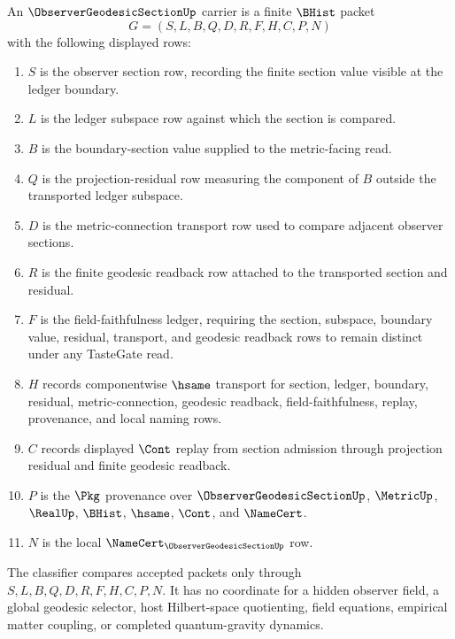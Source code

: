 \begin{definition}
\label{def:observer-geodesic-section-carrier}
An $\ObserverGeodesicSectionUp$ carrier is a finite $\BHist$ packet
$$
G=(S,L,B,Q,D,R,F,H,C,P,N)
$$
with the following displayed rows:
\begin{enumerate}
\item $S$ is the observer section row, recording the finite section value visible at the ledger boundary.
\item $L$ is the ledger subspace row against which the section is compared.
\item $B$ is the boundary-section value supplied to the metric-facing read.
\item $Q$ is the projection-residual row measuring the component of $B$ outside the transported ledger subspace.
\item $D$ is the metric-connection transport row used to compare adjacent observer sections.
\item $R$ is the finite geodesic readback row attached to the transported section and residual.
\item $F$ is the field-faithfulness ledger, requiring the section, subspace, boundary value, residual, transport, and geodesic readback rows to remain distinct under any TasteGate read.
\item $H$ records componentwise $\hsame$ transport for section, ledger, boundary, residual, metric-connection, geodesic readback, field-faithfulness, replay, provenance, and local naming rows.
\item $C$ records displayed $\Cont$ replay from section admission through projection residual and finite geodesic readback.
\item $P$ is the $\Pkg$ provenance over $\ObserverGeodesicSectionUp$, $\MetricUp$, $\RealUp$, $\BHist$, $\hsame$, $\Cont$, and $\NameCert$.
\item $N$ is the local $\NameCert_{\ObserverGeodesicSectionUp}$ row.
\end{enumerate}
The classifier compares accepted packets only through $S,L,B,Q,D,R,F,H,C,P,N$. It has no coordinate for a hidden observer field, a global geodesic selector, host Hilbert-space quotienting, field equations, empirical matter coupling, or completed quantum-gravity dynamics.
\end{definition}

